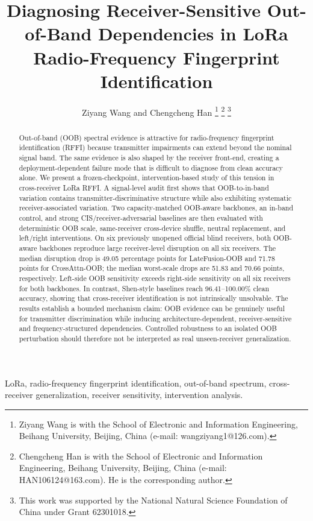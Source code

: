 \documentclass[journal]{IEEEtran}
\title{Diagnosing Receiver-Sensitive Out-of-Band Dependencies in LoRa Radio-Frequency Fingerprint Identification}
\author{Ziyang Wang and Chengcheng Han%
\thanks{Ziyang Wang is with the School of Electronic and Information Engineering, Beihang University, Beijing, China (e-mail: wangziyang1@126.com).}
\thanks{Chengcheng Han is with the School of Electronic and Information Engineering, Beihang University, Beijing, China (e-mail: HAN106124@163.com). He is the corresponding author.}
\thanks{This work was supported by the National Natural Science Foundation of China under Grant 62301018.}}
\begin{document}
\maketitle

\begin{abstract}
Out-of-band (OOB) spectral evidence is attractive for radio-frequency fingerprint identification (RFFI) because transmitter impairments can extend beyond the nominal signal band. The same evidence is also shaped by the receiver front-end, creating a deployment-dependent failure mode that is difficult to diagnose from clean accuracy alone. We present a frozen-checkpoint, intervention-based study of this tension in cross-receiver LoRa RFFI. A signal-level audit first shows that OOB-to-in-band variation contains transmitter-discriminative structure while also exhibiting systematic receiver-associated variation. Two capacity-matched OOB-aware backbones, an in-band control, and strong CIS/receiver-adversarial baselines are then evaluated with deterministic OOB scale, same-receiver cross-device shuffle, neutral replacement, and left/right interventions. On six previously unopened official blind receivers, both OOB-aware backbones reproduce large receiver-level disruption on all six receivers. The median disruption drop is 49.05 percentage points for LateFusion-OOB and 71.78 points for CrossAttn-OOB; the median worst-scale drops are 51.83 and 70.66 points, respectively. Left-side OOB sensitivity exceeds right-side sensitivity on all six receivers for both backbones. In contrast, Shen-style baselines reach 96.41--100.00\% clean accuracy, showing that cross-receiver identification is not intrinsically unsolvable. The results establish a bounded mechanism claim: OOB evidence can be genuinely useful for transmitter discrimination while inducing architecture-dependent, receiver-sensitive and frequency-structured dependencies. Controlled robustness to an isolated OOB perturbation should therefore not be interpreted as real unseen-receiver generalization.
\end{abstract}

\begin{IEEEkeywords}
LoRa, radio-frequency fingerprint identification, out-of-band spectrum, cross-receiver generalization, receiver sensitivity, intervention analysis.
\end{IEEEkeywords}







\end{document}
